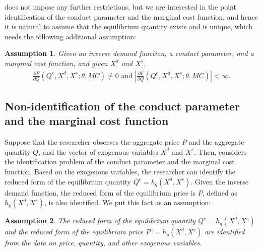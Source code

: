 \documentclass[11pt, a4paper]{article}
\newtheorem{assumption}{Assumption}
\theoremstyle{remark}
\begin{document}
\citet{lau1982identifying} does not impose any further restrictions, but we are interested in the point identification of the conduct parameter and the marginal cost function, and hence it is natural to assume that the equilibrium quantity exists and is unique, which needs the following additional assumption:
\begin{assumption}\label{assumption:unique_equilibrium}
    Given an inverse demand function, a conduct parameter, and a marginal cost function, and given $X^{d}$ and $X^{s}$,
    \begin{align}
        \frac{\partial F}{\partial Q}(Q^{e}, X^{d}, X^{s}; \theta, MC) \ne 0 \text{ and } \left| \frac{\partial F}{\partial Q}(Q^{e}, X^{d}, X^{s}; \theta, MC)\right| < \infty. 
    \end{align}
\end{assumption}




\subsection{Non-identification of the conduct parameter and the marginal cost function}\label{sec:definition_identification}

Suppose that the researcher observes the aggregate price $P$ and the aggregate quantity $Q$, and the vector of exogenous variables $X^{d}$ and $X^{s}$.
Then, \citet{lau1982identifying} considers the identification problem of the conduct parameter and the marginal cost function.
Based on the exogenous variables, the researcher can identify the reduced form of the equilibrium quantity $Q^e = h_q(X^{d}, X^{s})$.
Given the inverse demand function, the reduced form of the equilibrium price is $P$, defined as $h_p(X^{d}, X^{s})$, is also identified.
We put this fact as an assumption:
\begin{assumption}\label{assumption:reduced_form_identification}
    The reduced form of the equilibrium quantity $Q^e = h_q(X^{d}, X^{s})$ and the reduced form of the equilibrium price $P^e = h_p(X^{d}, X^{s})$ are identified from the data on price, quantity, and other exogenous variables.
\end{assumption}
\end{document}

